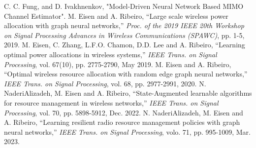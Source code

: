 \documentclass[a4paper, onecolumn, 11pt]{IEEEtran}
\begin{document}
    \begin{thebibliography}{1}
        C. C. Fung, and D. Ivakhnenkov, "Model-Driven Neural Network Based MIMO Channel Estimator".
        M. Eisen and A. Ribeiro, ``Large scale wireless power allocation with graph neural networks,'' \emph{Proc. of the 2019 IEEE 20th Workshop on Signal Processing Advances in Wireless Communications (SPAWC)}, pp. 1-5, 2019.
        M. Eisen, C. Zhang, L.F.O. Chamon, D.D. Lee and A. Ribeiro, ``Learning optimal power allocations in wireless systems,'' \emph{IEEE Trans. on Signal Processing}, vol. 67(10), pp. 2775-2790, May 2019.
        M. Eisen and A. Ribeiro, ``Optimal wireless resource allocation with random edge graph neural networks,'' \emph{IEEE Trans. on Signal Processing}, vol. 68, pp. 2977-2991, 2020.
        N. NaderiAlizadeh, M. Eisen and A. Ribeiro, ``State-Augmented learnable algorithms for resource management in wireless networks,'' \emph{IEEE Trans. on Signal Processing}, vol. 70, pp. 5898-5912, Dec. 2022.
        N. NaderiAlizadeh, M. Eisen and A. Ribeiro, ``Learning resilient radio resource management policies with graph neural networks,'' \emph{IEEE Trans. on Signal Processing}, volo. 71, pp. 995-1009, Mar. 2023.
    \end{thebibliography}
\end{document}

